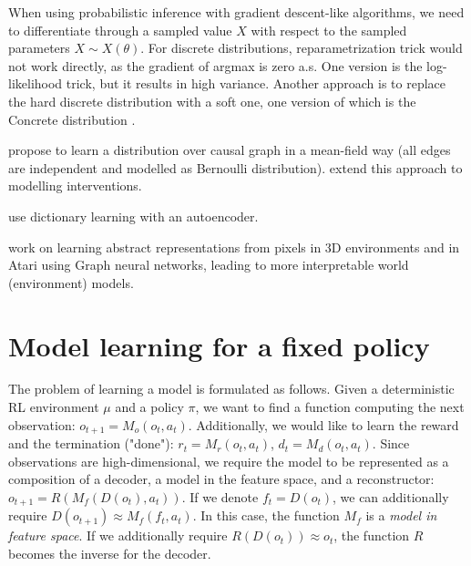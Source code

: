 \documentclass[a4paper,11pt,oneside]{report}
\begin{document}
When using probabilistic inference with gradient descent-like algorithms, we need to differentiate through a sampled value $X$ with respect to the sampled parameters $X\sim X(\theta)$. For discrete distributions, reparametrization trick would not work directly, as the gradient of argmax is zero a.s. One version is the log-likelihood trick, but it results in high variance. Another approach is to replace the hard discrete distribution with a soft one, one version of which is the Concrete distribution \cite{Maddison2017}.

\cite{kalainathan2018structural, ng2019masked} propose to learn a distribution over causal graph in a mean-field way (all edges are independent and modelled as Bernoulli distribution). \cite{Brouillard2020} extend this approach to modelling interventions.

\cite{Fallah2020} use dictionary learning with an autoencoder.

\cite{kipf2019contrastive} work on learning abstract representations from pixels in 3D environments and in Atari using Graph neural networks, leading to more interpretable world (environment) models.

\section{Model learning for a fixed policy}
The problem of learning a model is formulated as follows. Given a deterministic RL environment $\mu$ and a policy $\pi$, we want to find a function computing the next observation: $o_{t+1}=M_o(o_t, a_t)$. Additionally, we would like to learn the reward and the termination ("done"): $r_t=M_r(o_t, a_t)$, $d_t=M_d(o_t, a_t)$. Since observations are high-dimensional, we require the model to be represented as a composition of a decoder, a model in the feature space, and a reconstructor: $o_{t+1}=R(M_f(D(o_t), a_t))$. If we denote $f_t=D(o_t)$, we can additionally require $D(o_{t+1})\approx M_f(f_t, a_t)$. In this case, the function $M_f$ is a {\em model in feature space}. If we additionally require $R(D(o_t))\approx o_t$, the function $R$ becomes the inverse for the decoder.
\end{document}
